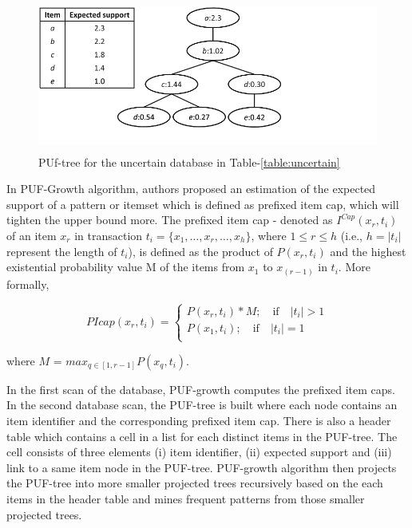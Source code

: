 \begin{figure}
\begin{center}
  \includegraphics[height=5cm,width=\linewidth]{./Figures/puf.png}
\end{center}
  \caption{PUf-tree for the uncertain database in Table-\ref{table:uncertain}
  \label{puf}}
\end{figure}

In PUF-Growth algorithm, authors proposed an estimation of the expected support of a pattern or itemset which is defined as prefixed item cap, which will tighten the upper bound more. The prefixed item cap - denoted as $I^{Cap}(x_r,t_i)$ of an item $x_r$ in transaction $t_i = \{ x_1, \ldots ,x_r, \ldots ,x_h\}$, where $1\leq r \leq h$ (i.e., $h=|t_i|$ represent the length of $t_i$), is defined as the product of $P(x_r,t_i)$ and the highest existential probability value M of the items from $x_1$ to $x_{(r-1)}$ in $t_i$. More  formally,



\[
    PIcap(x_r,t_i)=\left\{
                \begin{array}{ll}
                    P(x_r,t_i) * M; \quad \textrm{if} \quad |t_i| > 1\\
                  P(x_1,t_i); \quad \textrm{if}  \quad |t_i|=1\\
                  
                \end{array}
              \right.
  \]

where $M$ = $max_{q \in [1, r-1]} P(x_q,t_i)$.



In the first scan of the database, PUF-growth computes the prefixed item caps. In the second database scan, the  PUF-tree is built where each node contains an item identifier and the corresponding prefixed item cap. There is also a header table which contains a cell in a list for each distinct items in the PUF-tree. The cell consists of three elements (i) item identifier, (ii) expected support and (iii) link to a same item node in the PUF-tree. PUF-growth algorithm then projects the PUF-tree into more smaller projected trees recursively based on the each items in the header table and mines frequent patterns from those smaller projected trees.

